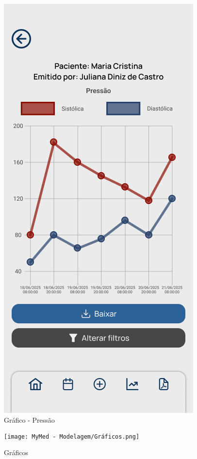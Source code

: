 \begin{figure}
	\centering
	\includegraphics[width=0.6\linewidth]{MyMed - Modelagem/Gráfico - Pressão.png}
	\caption{Gráfico - Pressão}
	\label{grafico_pressao}
\end{figure}

\begin{figure}
	\centering
	\texttt{[image: MyMed - Modelagem/Gráficos.png]}
	\caption{Gráficos}
	\label{graficos}
\end{figure}

